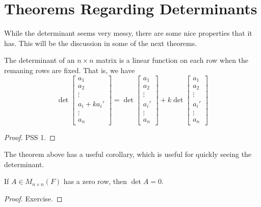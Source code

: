 \documentclass[main.tex]{subfiles}
\begin{document}
    \section{Theorems Regarding Determinants}
    While the determinant seems very messy, there are some nice properties that it has. This will be the discussion in some of the next theorems. 
    \begin{thrm}{}{}
            The determinant of an $n\times n$ matrix is a linear function on each row when the remaning rows are fixed. That is, we have 
            \begin{equation*}
                    \det \begin{bmatrix}
                            a_1 \\ a_2 \\ \vdots \\ a_i + ka_i' \\ \vdots \\ a_n
                    \end{bmatrix} = \det \begin{bmatrix}
                            a_1 \\ a_2 \\ \vdots \\ a_i' \\ \vdots \\ a_n
                    \end{bmatrix} + k\det \begin{bmatrix}
                            a_1 \\ a_2 \\ \vdots \\ a_i' \\ \vdots \\ a_n
                    \end{bmatrix}
            \end{equation*}
    \end{thrm}
    \begin{proof}
        PSS 1. 
    \end{proof}

    The theorem above has a useful corollary, which is useful for quickly seeing the determinant. 
    \begin{cor}{}{}
        If $A\in M_{n\times n}(F)$ has a zero row, then $\det A = 0$.
    \end{cor}
    \begin{proof}
        Exercise. 
    \end{proof}
\end{document}
